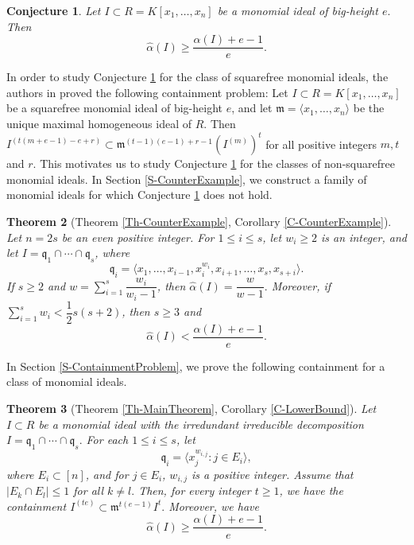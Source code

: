 \documentclass[12pt,reqno]{amsart}
\newtheorem{thm}{Theorem}[section]
\newtheorem{conj}[thm]{Conjecture}
\theoremstyle{definition}
\newcommand{\mi}{\mathfrak{m}}
\newcommand{\q}{\mathfrak{q}}
\newcommand{\ww}{\widehat{\alpha}}
\numberwithin{equation}{section}
\begin{document}
\begin{conj}\label{C1}
    Let $I \subset R = K[x_1, \ldots, x_n]$ be a monomial ideal of big-height $e.$ Then 
    \[\ww(I) \ge \frac{\alpha( I) + e - 1}{e}.\]
\end{conj} 

In order to study Conjecture \ref{C1} for the class of squarefree monomial ideals, the authors in \cite{CEHH} proved the following containment problem: Let $I \subset R = K[x_1, \ldots, x_n]$ be a squarefree monomial ideal of big-height $e$, and let $\mi = \langle x_1, \ldots, x_n \rangle$ be the unique maximal homogeneous ideal of $R.$ Then $I^{(t(m + e - 1) - e + r)} \subset \mi^{(t - 1)(e - 1) + r - 1}(I^{(m)})^t $ for all positive integers $m, t$ and $r.$ This motivates us to study Conjecture \ref{C1} for the classes of non-squarefree monomial ideals. In Section \ref{S-CounterExample}, we construct a family of monomial ideals for which Conjecture \ref{C1} does not hold.

\begin{thm}[Theorem \ref{Th-CounterExample}, Corollary \ref{C-CounterExample}]
    Let $n = 2s$ be an even positive integer. For $1 \le i \le s$, let $w_i \ge 2$ is an integer, and let $I = \q_1 \cap \cdots \cap \q_s$, where
    \[\q_i = \langle x_1, \ldots, x_{i - 1}, x_i^{w_i}, x_{i + 1}, \ldots, x_s, x_{s + i}\rangle.\]
    If $s \ge 2$ and $w = \sum_{i = 1}^{s} \dfrac{w_i}{w_i - 1}$, then $\ww(I) = \dfrac{w}{w - 1}.$ Moreover, if $\sum_{i = 1}^{s} w_i < \dfrac{1}{2} s(s + 2)$, then $s \ge 3$ and 
    \[\ww(I) < \dfrac{\alpha(I) + e - 1}{e}.\]
\end{thm} 

\vspace{2mm}

In Section \ref{S-ContainmentProblem}, we prove the following containment for a class of monomial ideals. 

\begin{thm}[Theorem \ref{Th-MainTheorem}, Corollary \ref{C-LowerBound}]
    Let $I \subset R$ be a monomial ideal with the irredundant irreducible decomposition $I = \q_1 \cap \cdots \cap \q_s.$ For each $1 \le i \le s$, let 
    \[\q_i = \langle x_j^{w_{i, j}} : j \in E_i \rangle,\] 
    where $E_i \subset [n]$, and for $j \in E_i$, $w_{i, j}$ is a positive integer. Assume that $|E_k \cap E_l| \le 1$ for all $k \ne l.$ Then, for every integer $t \ge 1$, we have the containment $I^{(te)} \subset \mi^{t(e - 1)} I^t.$ Moreover, we have 
    \[\ww(I) \ge \dfrac{\alpha(I) + e - 1}{e}.\]
\end{thm} 
    
\end{document}
